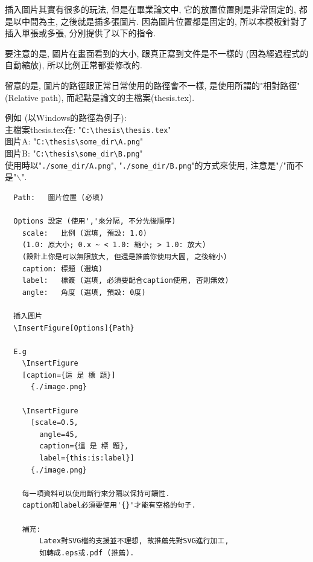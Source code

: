 

插入圖片其實有很多的玩法, 但是在畢業論文中, 它的放置位置則是非常固定的, 都是以中間為主, 之後就是插多張圖片. 因為圖片位置都是固定的, 所以本模板針對了插入單張或多張, 分別提供了以下的指令.

要注意的是, 圖片在畫面看到的大小, 跟真正寫到文件是不一樣的 (因為經過程式的自動縮放), 所以比例正常都要修改的.

留意的是, 圖片的路徑跟正常日常使用的路徑會不一樣, 是使用所謂的"相對路徑" (Relative path), 而起點是論文的主檔案(thesis.tex).

\noindent 例如 (以Windows的路徑為例子):\\
主檔案thesis.tex在: "\verb|C:\thesis\thesis.tex|"\\
圖片A: "\verb|C:\thesis\some_dir\A.png|"\\
圖片B: "\verb|C:\thesis\some_dir\B.png|"\\
使用時以"\verb|./some_dir/A.png|", "\verb|./some_dir/B.png|"的方式來使用, 注意是"$/$"而不是"$\backslash$".

\newpage
{}
  \EmptyLine
  \begin{fmpage}{\textwidth}
  \begin{verbatim}
  Path:   圖片位置 (必填)

  Options 設定 (使用','來分隔, 不分先後順序)
    scale:   比例 (選填, 預設: 1.0)
    (1.0: 原大小; 0.x ~ < 1.0: 縮小; > 1.0: 放大)
    (設計上你是可以無限放大, 但還是推薦你使用大圖, 之後縮小)
    caption: 標題 (選填)
    label:   標簽 (選填, 必須要配合caption使用, 否則無效)
    angle:   角度 (選填, 預設: 0度)

  插入圖片
  \InsertFigure[Options]{Path}

  E.g
    \InsertFigure
    [caption={這 是 標 題}]
      {./image.png}

    \InsertFigure
      [scale=0.5,
        angle=45,
        caption={這 是 標 題},
        label={this:is:label}]
      {./image.png}

    每一項資料可以使用斷行來分隔以保持可讀性.
    caption和label必須要使用'{}'才能有空格的句子.

    補充:
        Latex對SVG檔的支援並不理想, 故推薦先對SVG進行加工,
        如轉成.eps或.pdf (推薦).
  \end{verbatim}
  \end{fmpage}

